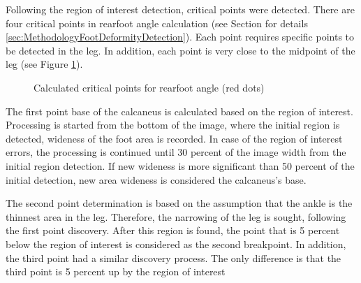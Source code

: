 Following the region of interest detection, critical points were detected. There are four critical points in rearfoot angle calculation (see Section for details \ref{sec:MethodologyFootDeformityDetection}). Each point requires specific points to be detected in the leg. In addition, each point is very close to the midpoint of the leg (see Figure \ref{fig:BatchProcessDotsStudyII}).

\begin{figure}[htbp]
\centering
{}
\caption{Calculated critical points for rearfoot angle (red dots)}
\label{fig:BatchProcessDotsStudyII}
\end{figure}

The first point base of the calcaneus is calculated based on the region of interest. Processing is started from the bottom of the image, where the initial region is detected, wideness of the foot area is recorded. In case of the region of interest errors, the processing is continued until 30 percent of the image width from the initial region detection. If new wideness is more significant than 50 percent of the initial detection, new area wideness is considered the calcaneus's base.

The second point determination is based on the assumption that the ankle is the thinnest area in the leg. Therefore, the narrowing of the leg is sought, following the first point discovery. After this region is found, the point that is 5 percent below the region of interest is considered as the second breakpoint. In addition, the third point had a similar discovery process. The only difference is that the third point is 5 percent up by the region of interest

